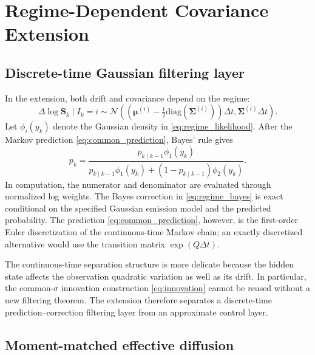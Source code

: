 \documentclass[a4paper,10pt]{article}
\newcommand{\N}{\mathcal{N}}
\newcommand{\diag}{\mathrm{diag}}
\newcommand{\bmu}{\bm{\mu}}
\newcommand{\bSigma}{\bm{\Sigma}}
\newcommand{\bS}{\bm{S}}
\begin{document}
\section{Regime-Dependent Covariance Extension}

\subsection{Discrete-time Gaussian filtering layer}

In the extension, both drift and covariance depend on the regime:
\begin{equation}
\Delta\log\bS_k\mid I_k=i
\sim\N\left(
\left(\bmu^{(i)}-\tfrac12\diag(\bSigma^{(i)})\right)\Delta t,
\bSigma^{(i)}\Delta t
\right).
\label{eq:regime_likelihood}
\end{equation}
Let $\phi_i(y_k)$ denote the Gaussian density in \eqref{eq:regime_likelihood}. After the Markov prediction \eqref{eq:common_prediction}, Bayes' rule gives
\begin{equation}
p_k
=\frac{p_{k\mid k-1}\phi_1(y_k)}
{p_{k\mid k-1}\phi_1(y_k)+(1-p_{k\mid k-1})\phi_2(y_k)}.
\label{eq:regime_bayes}
\end{equation}
In computation, the numerator and denominator are evaluated through normalized log weights. The Bayes correction in \eqref{eq:regime_bayes} is exact conditional on the specified Gaussian emission model and the predicted probability. The prediction \eqref{eq:common_prediction}, however, is the first-order Euler discretization of the continuous-time Markov chain; an exactly discretized alternative would use the transition matrix $\exp(Q\Delta t)$.

The continuous-time separation structure is more delicate because the hidden state affects the observation quadratic variation as well as its drift. In particular, the common-$\sigma$ innovation construction \eqref{eq:innovation} cannot be reused without a new filtering theorem. The extension therefore separates a discrete-time prediction--correction filtering layer from an approximate control layer.

\subsection{Moment-matched effective diffusion}
\end{document}
